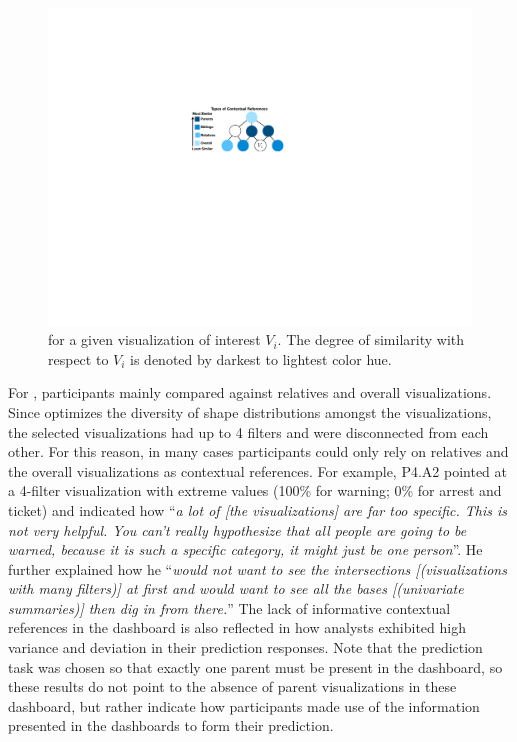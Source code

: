 \begin{figure}[h!]
\centering
\includegraphics[width=0.7\linewidth]{figures/contextual_reference.pdf}
\caption{ for a given visualization of interest $V_i$. The degree of similarity with respect to $V_i$ is denoted by darkest to lightest color hue.}
\label{fig:reference}
\end{figure}
\par {} For \cluster, participants mainly compared against relatives and overall visualizations. Since \cluster optimizes the diversity of shape distributions amongst the visualizations, the selected visualizations had up to 4 filters and were disconnected from each other. For this reason, in many cases participants could only rely on relatives and the overall visualizations as contextual references. For example, P4.A2 pointed at a 4-filter visualization with extreme values (100\% for warning; 0\% for arrest and ticket) and indicated how ``\textit{a lot of [the visualizations] are far too specific. This is not very helpful. You can't really hypothesize that all people are \change{[sic]} going to be warned, because it is such a specific category, it might just be one person}''. %
He further explained how he ``\textit{would not want to see the intersections [(visualizations with many filters)] at first and would want to see all the bases [(univariate summaries)] then dig in from there.}'' The lack of informative contextual references in the \cluster dashboard is also reflected in how analysts exhibited high variance and deviation in their prediction responses. Note that the prediction task was chosen so that exactly one parent must be present in the dashboard, so these results do not point to the absence of parent visualizations in these dashboard, but rather indicate how participants made use of the information presented in the dashboards to form their prediction.
